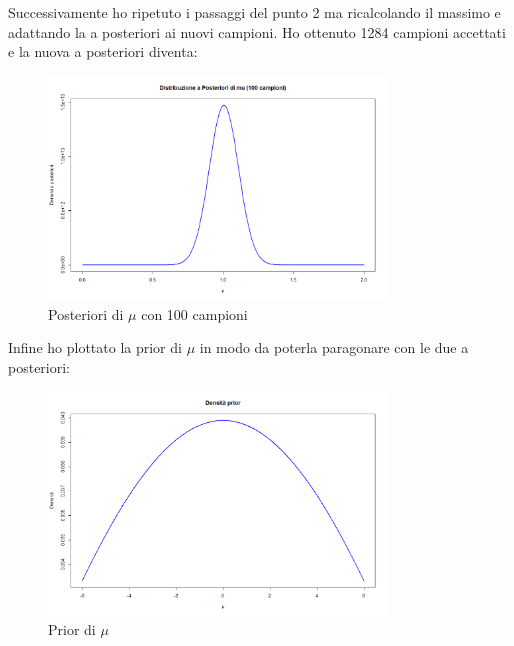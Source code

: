 \documentclass[a4paper,12pt]{article}
\begin{document}
\begin{itemize}
	Successivamente ho ripetuto i passaggi del punto 2 ma ricalcolando il massimo e adattando la a posteriori ai nuovi campioni.
	Ho ottenuto 1284 campioni accettati e la nuova a posteriori diventa:
	\begin{figure}[h] %
		\centering %
		\includegraphics[width=0.8\textwidth]{newpost.png} %
		\caption{Posteriori di $\mu$ con 100 campioni} %
		\label{fig:immagine} %
	\end{figure}
	\newline
	Infine ho plottato la prior di $\mu$ in modo da poterla paragonare con le due a posteriori:
	\begin{figure}[h] %
		\centering %
		\includegraphics[width=0.8\textwidth]{prior.png} %
		\caption{Prior di $\mu$} %
		\label{fig:immagine} %
	\end{figure}

\end{itemize}
\end{document}
